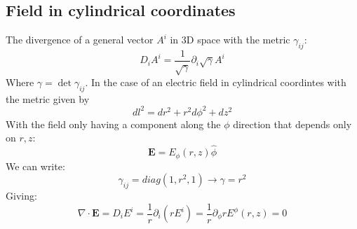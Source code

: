 \documentclass{article}
\begin{document}
\subsection{Field in cylindrical coordinates}
The divergence of a general vector $A^i$ in 3D space with the metric $\gamma_{ij}$:
\begin{equation}
    D_i A^i = \frac{1}{\sqrt{\gamma}}\partial_i \sqrt{\gamma}A^i
\end{equation}
Where $\gamma = \det\gamma_{ij}$. In the case of an electric field in cylindrical coordintes with the metric given by
\begin{equation}
    dl^2 = dr^2 + r^2d\phi^2 + dz^2
\end{equation}
With the field only having a component along the $\phi$ direction that depends only on $r, z$:
\begin{equation}
    \boldsymbol{E} = E_\phi(r, z) \hat{\phi}
\end{equation}
We can write:
\begin{equation}
    \gamma_{ij} = diag(1, r^2, 1) \rightarrow \gamma = r^2
\end{equation}
Giving:
\begin{equation}
    \nabla \cdot \boldsymbol{E} = D_i E^i = \frac{1}{r}\partial_i \left(rE^i\right) = \frac{1}{r}\partial_\phi r E^\phi(r, z) = 0
\end{equation}
\end{document}
